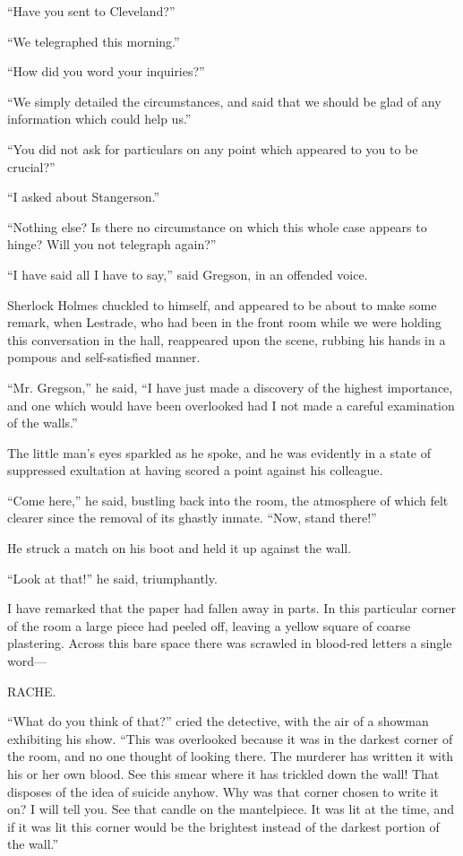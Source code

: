\documentclass[12pt]{book}
\begin{document}
“Have you sent to Cleveland?” 

“We telegraphed this morning.” 

“How did you word your inquiries?” 

“We simply detailed the circumstances, and said that we should be glad of any information which could help us.” 

“You did not ask for particulars on any point which appeared to you to be crucial?” 

“I asked about Stangerson.” 

“Nothing else? Is there no circumstance on which this whole case appears to hinge? Will you not telegraph again?” 

“I have said all I have to say,” said Gregson, in an offended voice. 

Sherlock Holmes chuckled to himself, and appeared to be about to make some remark, when Lestrade, who had been in the front room while we were holding this conversation in the hall, reappeared upon the scene, rubbing his hands in a pompous and self-satisfied manner. 

“Mr. Gregson,” he said, “I have just made a discovery of the highest importance, and one which would have been overlooked had I not made a careful examination of the walls.” 

The little man’s eyes sparkled as he spoke, and he was evidently in a state of suppressed exultation at having scored a point against his colleague. 

“Come here,” he said, bustling back into the room, the atmosphere of which felt clearer since the removal of its ghastly inmate. “Now, stand there!” 

He struck a match on his boot and held it up against the wall. 

“Look at that!” he said, triumphantly. 

I have remarked that the paper had fallen away in parts. In this particular corner of the room a large piece had peeled off, leaving a yellow square of coarse plastering. Across this bare space there was scrawled in blood-red letters a single word— 

                         RACHE.

“What do you think of that?” cried the detective, with the air of a showman exhibiting his show. “This was overlooked because it was in the darkest corner of the room, and no one thought of looking there. The murderer has written it with his or her own blood. See this smear where it has trickled down the wall! That disposes of the idea of suicide anyhow. Why was that corner chosen to write it on? I will tell you. See that candle on the mantelpiece. It was lit at the time, and if it was lit this corner would be the brightest instead of the darkest portion of the wall.” 
\end{document}
